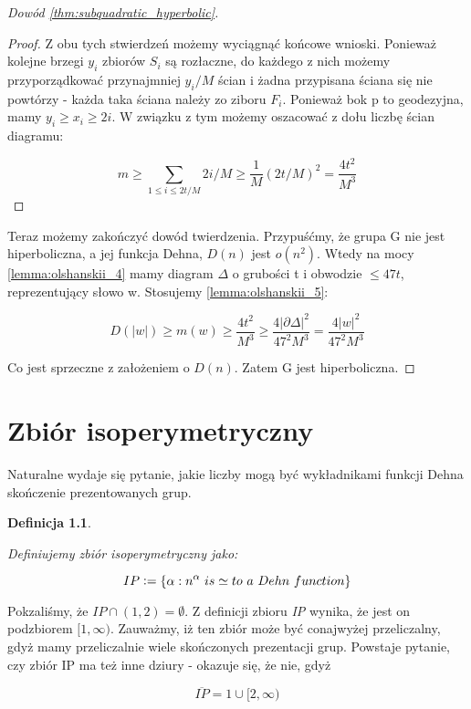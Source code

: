 \documentclass[licencjacka]{pracamgr}
\newcommand{\defeq}{\vcentcolon=}
\newtheorem{defi}{Definicja}[section]
\begin{document}
\begin{proof}[Dowód \ref{thm:subquadratic_hyperbolic}]
\begin{proof}
Z obu tych stwierdzeń możemy wyciągnąć końcowe wnioski. Ponieważ kolejne brzegi $y_{i}$ zbiorów $S_{i}$ są rozłaczne, do każdego z nich możemy przyporządkować przynajmniej $y_{i} / M$ ścian i żadna przypisana ściana się nie powtórzy - każda taka ściana należy zo ziboru $F_{i}$. Ponieważ bok p to geodezyjna, mamy $y_{i} \geq x_{i} \geq 2i$. W związku z tym możemy oszacować z dołu liczbę ścian diagramu:

\[ m \geq \sum_{1 \leq i \leq 2t/M} 2i/M \geq \frac{1}{M} (2t/M) ^2 = \frac{4t^2}{M^3} \]

\end{proof}

Teraz możemy zakończyć dowód twierdzenia. Przypuśćmy, że grupa G nie jest hiperboliczna, a jej funkcja Dehna, $D(n)$ jest $o(n^2)$. Wtedy na mocy \ref{lemma:olshanskii_4} mamy diagram $\Delta$ o grubości t i obwodzie $\leq 47t$, reprezentujący słowo w. Stosujemy \ref{lemma:olshanskii_5}:

\[ D(|w|) \geq m(w) \geq \frac{4t^2}{M^3} \geq \frac{4 | \partial \Delta |^2}{47^2M^3} = \frac{4 |w|^2}{47^2M^3} \]

Co jest sprzeczne z założeniem o $D(n)$. Zatem G jest hiperboliczna.

\end{proof}

\chapter{Zbiór isoperymetryczny}

Naturalne wydaje się pytanie, jakie liczby mogą być wykładnikami funkcji Dehna skończenie prezentowanych grup.

\begin{defi}\label{isoperimetric set}

Definiujemy \textit{zbiór isoperymetryczny} jako:

\[ IP \defeq \{ \alpha : n^{\alpha} \ is \simeq to \ a \ Dehn \ function \} \]

\end{defi}

Pokzaliśmy, że $IP \cap (1, 2) = \emptyset$. Z definicji zbioru \textit{IP} wynika, że jest on podzbiorem $[1, \infty)$. Zauważmy, iż ten zbiór może być conajwyżej przeliczalny, gdyż mamy przeliczalnie wiele skończonych prezentacji grup. Powstaje pytanie, czy zbiór IP ma też inne dziury - okazuje się, że nie, gdyż

\[ \overline{IP} = {1} \cup [2, \infty) \]
\end{document}
